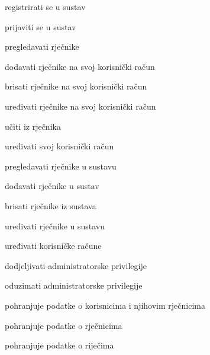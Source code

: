			
			\begin{packed_enum}
				\item  {}
				
				\begin{packed_enum}
					\item registrirati se u sustav
					\item prijaviti se u sustav
				\end{packed_enum}

				
			
				\item  {}
				
				\begin{packed_enum}
					\item pregledavati rječnike
					\item dodavati rječnike na svoj korisnički račun
					\item brisati rječnike na svoj korisnički račun
					\item uređivati rječnike na svoj korisnički račun
					\item učiti iz rječnika
					\item uređivati svoj korisnički račun
					
				\end{packed_enum}

				\item {}
				\begin{packed_enum}
					\item pregledavati rječnike u sustavu
					\item dodavati rječnike u sustav
					\item brisati rječnike iz sustava
					\item uređivati rječnike u sustavu
					\item uređivati korisničke račune
					\item dodjeljivati administratorske privilegije
					\item oduzimati administratorske privilegije
				\end{packed_enum}

				\item {}
				\begin{packed_enum}
					\item pohranjuje podatke o korisnicima i njihovim rječnicima
					\item pohranjuje podatke o rječnicima
					\item pohranjuje podatke o riječima
				\end{packed_enum}

			\end{packed_enum}
			
